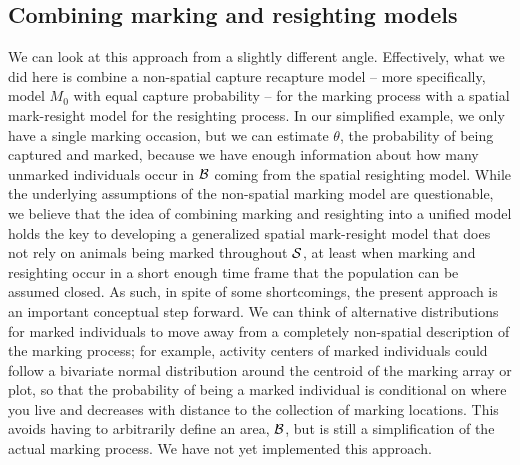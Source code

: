 \subsection{Combining marking and resighting models}
We can look at this approach from a slightly different angle. Effectively, what we did here is combine a non-spatial capture recapture model -- more specifically, model $M_0$ with equal capture probability -- for the marking process with a spatial mark-resight model for the resighting process. In our simplified example, we only have a single marking occasion, but we can estimate $\theta$, the probability of being captured and marked, because we have enough information about how many unmarked individuals occur in ${\cal B}$ coming from the spatial resighting model. While the underlying assumptions of the non-spatial marking model are questionable, we believe that the idea of combining marking and resighting into a unified model holds the key to developing a generalized spatial mark-resight model that does not rely on animals being marked throughout ${\cal S}$, at least when marking and resighting occur in a short enough time frame that the population can be assumed closed. As such, in spite of some shortcomings, the present approach is an important conceptual step forward. We can think of alternative distributions for marked individuals to move away from a completely non-spatial description of the marking process; for example, activity centers of marked individuals could follow a bivariate normal distribution around the centroid of the marking array or plot, so that the probability of being a marked individual is conditional on where you live and decreases with distance to the collection of marking locations. This avoids having to arbitrarily define an area, ${\cal B}$, but is still a simplification of the actual marking process. We have not yet implemented this approach.
